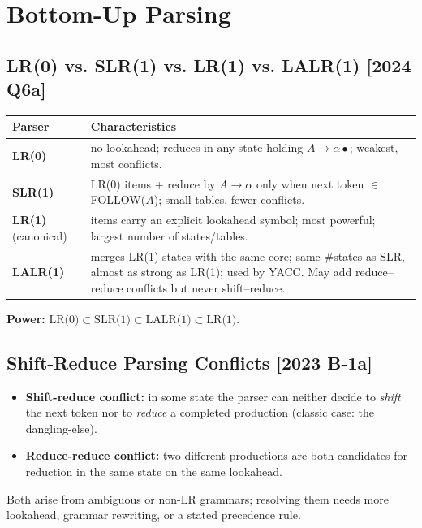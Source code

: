\documentclass[12pt, a4paper]{article}
\newenvironment{qbox}{\begin{mdframed}[style=qframe]}{\end{mdframed}}
\newcommand{\yr}[1]{{\small\color{accent}\textbf{[#1]}}}
\newcommand{\term}[1]{\textbf{\color{keyblue}#1}}
\begin{document}
\section{Bottom-Up Parsing}

\subsection{LR(0) vs. SLR(1) vs. LR(1) vs. LALR(1) \yr{2024 Q6a}}
\begin{qbox}
\begin{tabularx}{\linewidth}{@{}l Y@{}}
\toprule
\textbf{Parser} & \textbf{Characteristics}\\
\midrule
\term{LR(0)} & no lookahead; reduces in any state holding $A\to\alpha\bullet$; weakest, most conflicts.\\
\term{SLR(1)} & LR(0) items + reduce by $A\to\alpha$ only when next token $\in$ FOLLOW($A$); small tables, fewer conflicts.\\
\term{LR(1)} (canonical) & items carry an explicit lookahead symbol; most powerful; largest number of states/tables.\\
\term{LALR(1)} & merges LR(1) states with the same core; same \#states as SLR, almost as strong as LR(1); used by YACC. May add reduce–reduce conflicts but never shift–reduce.\\
\bottomrule
\end{tabularx}
\smallskip
\textbf{Power:} \(\text{LR(0)} \subset \text{SLR(1)} \subset \text{LALR(1)} \subset \text{LR(1)}\).
\end{qbox}

\subsection{Shift-Reduce Parsing Conflicts \yr{2023 B-1a}}
\begin{qbox}
\begin{itemize}
\item \term{Shift-reduce conflict:} in some state the parser can neither decide to \emph{shift} the next token nor to
\emph{reduce} a completed production (classic case: the dangling-else).
\item \term{Reduce-reduce conflict:} two different productions are both candidates for reduction in the same state on the same lookahead.
\end{itemize}
Both arise from ambiguous or non-LR grammars; resolving them needs more lookahead, grammar rewriting, or a stated precedence rule.
\end{qbox}
\end{document}
